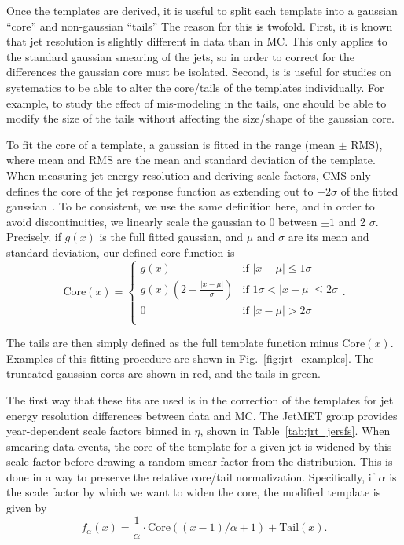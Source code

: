 Once the templates are derived, it is useful to split each template into a gaussian ``core'' and
non-gaussian ``tails'' The reason for this is twofold. First, it is known that jet resolution
is slightly different in data than in MC. This only applies to the standard gaussian smearing of the jets,
so in order to correct for the differences the gaussian core must be isolated.
Second, is is useful for studies on systematics to be able to alter the core/tails of the
templates individually. For example, to study the effect of mis-modeling in the tails,
one should be able to modify the size of the tails without affecting the size/shape
of the gaussian core.

To fit the core of a template, a gaussian is fitted in the range (mean $\pm$ RMS), where mean and RMS
are the mean and standard deviation of the template.
When measuring jet energy resolution and deriving scale factors, CMS only defines the core
of the jet response function as extending out to $\pm2\sigma$ of the fitted gaussian~\cite{JME_jes_jer}.
To be consistent, we use the same definition here, and in order to avoid discontinuities,
we linearly scale the gaussian to 0 between $\pm1$ and 2 $\sigma$. Precisely, if $g(x)$ is the
full fitted gaussian, and $\mu$ and $\sigma$ are its mean and standard deviation, our defined core function is
\[
\text{Core}(x) = 
\begin{cases}
g(x) & \text{if } |x-\mu| \leq 1\sigma \\
g(x)\left(2-\frac{|x-\mu|}{\sigma}\right) & \text{if } 1\sigma < |x-\mu| \leq 2\sigma \\
0 & \text{if } |x-\mu| > 2\sigma \\
\end{cases}.
\]

The tails are then simply defined as the full template function minus $\text{Core}(x)$.
Examples of this fitting procedure are shown in Fig.~\ref{fig:jrt_examples}. The truncated-gaussian
cores are shown in red, and the tails in green.

The first way that these fits are used is in the correction of the templates for jet energy resolution
differences between data and MC. The JetMET group provides year-dependent scale factors binned in 
$\eta$, shown in Table~\ref{tab:jrt_jersfs}. When smearing data events, the core of the template for a given jet
is widened by this scale factor before drawing a random smear factor from the distribution. This is done in a 
way to preserve the relative core/tail normalization. Specifically, if $\alpha$ is the scale factor by which we
want to widen the core, the modified template is given by
\[
f_\alpha(x) = \frac{1}{\alpha}\cdot\text{Core}((x-1)/\alpha+1) + \text{Tail}(x).
\]

